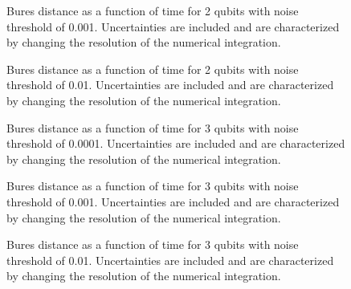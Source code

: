 \pagebreak

\begin{figure}[h]
\begin{center}
\end{center}
\caption{Bures distance as a function of time for 2 qubits with noise
threshold of 0.001.  Uncertainties are included and are characterized 
by changing the resolution of the numerical integration.}
\end{figure}

\pagebreak

\begin{figure}[h]
\begin{center}
\end{center}
\caption{Bures distance as a function of time for 2 qubits with noise
threshold of 0.01.  Uncertainties are included and are characterized 
by changing the resolution of the numerical integration.}
\end{figure}

\pagebreak

\begin{figure}[h]
\begin{center}
\end{center}
\caption{Bures distance as a function of time for 3 qubits with noise
threshold of 0.0001.  Uncertainties are included and are characterized 
by changing the resolution of the numerical integration.}
\end{figure}

\pagebreak

\begin{figure}[h]
\begin{center}
\end{center}
\caption{Bures distance as a function of time for 3 qubits with noise
threshold of 0.001.  Uncertainties are included and are characterized 
by changing the resolution of the numerical integration.}
\end{figure}

\pagebreak

\begin{figure}[h]
\begin{center}
\end{center}
\caption{Bures distance as a function of time for 3 qubits with noise
threshold of 0.01.  Uncertainties are included and are characterized 
by changing the resolution of the numerical integration.}
\end{figure}

